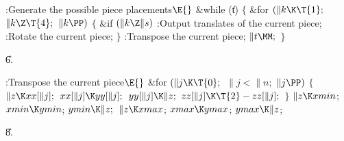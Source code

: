 \B{}:Generate the possible piece placements\X${}\E{}$\6
\&{while} (\|t)\5
${}\{{}$\1\6
\&{for} ${}(\|k\K\T{1};{}$ ${}\|k\Z\T{4};{}$ ${}\|k\PP){}$\5
${}\{{}$\1\6
\&{if} ${}(\|k\Z\|s){}$\1\5
:Output translates of the current piece\X;\2\6
:Rotate the current piece\X;\6
\4${}\}{}$\2\6
:Transpose the current piece\X;\6
${}\|t\MM;{}$\6
\4${}\}{}$\2\par
\U6.\fi

\B{}:Transpose the current piece\X${}\E{}$\6
\&{for} ${}(\|j\K\T{0};{}$ ${}\|j<\|n;{}$ ${}\|j\PP){}$\5
${}\{{}$\1\6
${}\|z\K\\{xx}[\|j];{}$\6
${}\\{xx}[\|j]\K\\{yy}[\|j];{}$\6
${}\\{yy}[\|j]\K\|z;{}$\6
${}\\{zz}[\|j]\K\T{2}-\\{zz}[\|j];{}$\6
\4${}\}{}$\2\6
${}\|z\K\\{xmin}{}$;\5
${}\\{xmin}\K\\{ymin}{}$;\5
${}\\{ymin}\K\|z;{}$\6
${}\|z\K\\{xmax}{}$;\5
${}\\{xmax}\K\\{ymax}{}$;\5
${}\\{ymax}\K\|z{}$;\par
\U8.\fi

